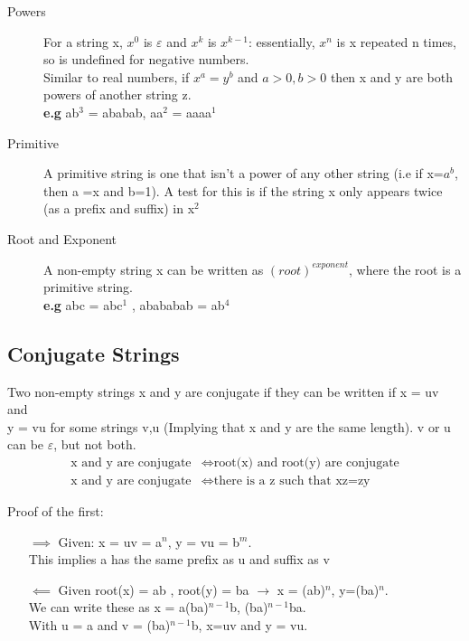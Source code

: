 \begin{description}
    \item[Powers] For a string x, $x^0$ is $\varepsilon$ and $x^k$ is $x^{k-1}$: essentially, $x^n$ is x repeated n times, so is undefined for negative numbers.\\
     Similar to real numbers, if $x^a = y^b$ and $a>0, b>0 $ then x and y are both powers of another string z.\\
        \textbf{e.g} ab$^3$ = ababab, aa$^2$ = aaaa$^1$  
    \item[Primitive] A primitive string is one that isn't a power of any other string (i.e if x=$a^b$, then a =x and b=1). A test for this is if the string x only appears twice (as a prefix and suffix) in x$^2$
    \item[Root and Exponent] A non-empty string x can be written as $(root)^{exponent}$, where the root is a primitive string.\\
        \textbf{e.g} abc = abc$^1$ , abababab = ab$^4$ 
\end{description}

\subsection{Conjugate Strings}
Two non-empty strings x and y are conjugate if they can be written if x = uv and\\ y = vu for some strings v,u (Implying that x and y are the same length). v or u can be $\varepsilon$, but not both. 
\begin{align}
    \text{x and y are conjugate} &\iff \text{root(x) and root(y) are conjugate} \nonumber \\ 
    \text{x and y are conjugate} &\iff \text{there is a z such that xz=zy} \nonumber 
\end{align}

Proof of the first:
\begin{enumerate}
    \item [$\implies$] Given: x = uv = a$^n$, y = vu = b$^m$. \\This implies a has the same prefix as u and suffix as v
    \item [$\impliedby$] Given root(x) = ab , root(y) = ba $\rightarrow$ x = (ab)$^n$, y=(ba)$^n$.\\ We can write these as x = a(ba)$^{n-1}$b, (ba)$^{n-1}$ba.\\ With u = a and v = (ba)$^{n-1}$b, x=uv and y = vu.    
\end{enumerate}


